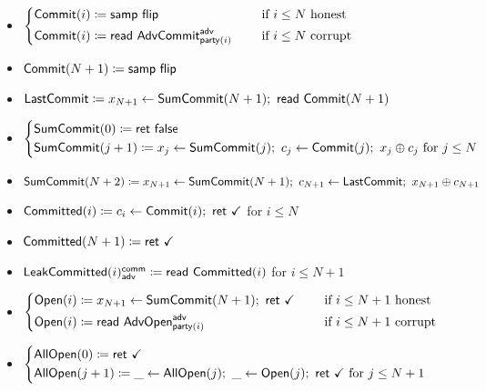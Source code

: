 \begin{itemize}
\item {\color{blue} $\begin{cases*} \Commit(i) \coloneqq \samp{\flip} & \hspace{10pt} \text{if $i \leq N$ honest} \\ \Commit(i) \coloneqq \read{\AdvCommit^\adv_{\party(i)}} & \hspace{10pt} \text{if $i \leq N$ corrupt} \end{cases*}$}
\item {\color{blue} $\mathsf{Commit}(N+1) \coloneqq \mathsf{samp} \ \mathsf{flip}$}
\item {\color{blue} $\LastCommit \coloneqq x_{N+1} \leftarrow \SumCommit(N+1); \ \read{\Commit(N+1)}$}
\item {\color{blue} $\begin{cases*} \SumCommit(0) \coloneqq \ret{\false} \\ \SumCommit(j+1) \coloneqq x_j \leftarrow \SumCommit(j); \ c_j \leftarrow \Commit(j); \ x_j \oplus c_j \text{ for $j \leq N$} \end{cases*}$}
\item {\color{blue} $\SumCommit(N+2) \coloneqq x_{N+1} \leftarrow \SumCommit(N+1); \ c_{N+1} \leftarrow \LastCommit; \ x_{N+1} \oplus c_{N+1}$}
\item {\color{magenta} $\mathsf{Committed}(i) \coloneqq c_i \leftarrow \mathsf{Commit}(i); \ \mathsf{ret} \ \checkmark$ for $i \leq N$}
\item {\color{magenta} $\mathsf{Committed}(N+1) \coloneqq \mathsf{ret} \ \checkmark$}
\item {\color{magenta} $\mathsf{LeakCommitted}(i)^{\mathsf{comm}}_{\mathsf{adv}} \coloneqq \mathsf{read} \ \mathsf{Committed}(i)$ for $i \leq N+1$}
\item {\color{teal} $\begin{cases*} \Open(i) \coloneqq x_{N+1} \leftarrow \SumCommit(N+1); \ \ret{\checkmark} & \hspace{10pt} \text{if $i \leq N+1$ honest} \\ \Open(i) \coloneqq \read{\AdvOpen^\adv_{\party(i)}} & \hspace{10pt} \text{if $i \leq N+1$ corrupt} \end{cases*}$}
\item {\color{teal} $\begin{cases*} \AllOpen(0) \coloneqq \ret{\checkmark} \\ \AllOpen(j+1) \coloneqq \_ \leftarrow \AllOpen(j); \ \_ \leftarrow \Open(j); \ \ret{\checkmark} \text{ for $j \leq N+1$} \end{cases*}$}

\end{itemize}

